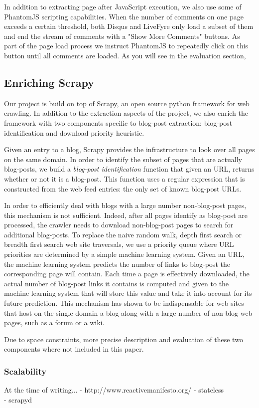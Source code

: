In addition to extracting page after JavaScript execution, we also use some of PhantomJS scripting capabilities. When the number of comments on one page exceeds a certain threshold, both Disqus and LiveFyre only load a subset of them and end the stream of comments with a "Show More Comments" buttons. As part of the page load process we instruct PhantomJS to repeatedly click on this button until all comments are loaded. As you will see in the evaluation section, 


\subsection{Enriching Scrapy}
Our project is build on top of Scrapy\cite{scrapy2013}, an open source python framework for web crawling. In addition to the extraction aspects of the project, we also enrich the framework with two components specific to blog-post extraction: blog-post identification and download priority heuristic.

Given an entry to a blog, Scrapy provides the infrastructure to look over all pages on the same domain. In order to identify the subset of pages that are actually blog-posts, we build a \emph{blog-post identification} function that given an URL, returns whether or not it is a blog-post. This function uses a regular expression that is constructed from the web feed entries: the only set of known blog-post URLs.

In order to efficiently deal with blogs with a large number non-blog-post pages, this mechanism is not sufficient. Indeed, after all pages identify as blog-post are processed, the crawler needs to download non-blog-post pages to search for additional blog-posts. To replace the naive random walk, depth first search or breadth first search web site traversals, we use a priority queue where URL priorities are determined by a simple machine learning system. Given an URL, the machine learning system predicts the number of links to blog-post the corresponding page will contain. Each time a page is effectively downloaded, the actual number of blog-post links it contains is computed and given to the machine learning system that will store this value and take it into account for its future prediction. This mechanism has shown to be indispensable for web sites that host on the single domain a blog along with a large number of non-blog web pages, such as a forum or a wiki.

Due to space constraints, more precise description and evaluation of these two components where not included in this paper.

\subsubsection{Scalability}
At the time of writing...
- http://www.reactivemanifesto.org/
- stateless \\
- scrapyd \\
